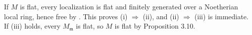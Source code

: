 If $M$ is flat, every localization is flat and finitely generated over a Noetherian local ring, hence free by . This proves (i) $\Rightarrow$ (ii), and (ii) $\Rightarrow$ (iii) is immediate. If (iii) holds, every $M_{\mathfrak{m}}$ is flat, so $M$ is flat by Proposition 3.10.
